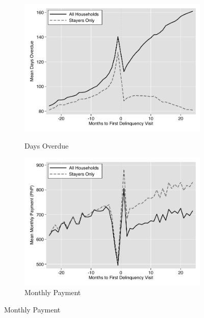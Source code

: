\documentclass[12pt]{article}
\begin{document}
\begin{figure}[t!]
\begin{subfigure}[b]{0.49\textwidth}
        \label{fig:line_bal}
    \end{subfigure}
    \vskip 1mm \vskip 0pt
    \begin{subfigure}[b]{0.49\textwidth}
        \centering
        \caption[]{\small Days Overdue}
        \vspace{-1mm}
        \includegraphics[width=\textwidth,trim={.2cm .2cm .2cm 0cm}, clip=true]{tables/line_ar}
        \label{fig:line_ar}
    \end{subfigure}
    \hfill
    \begin{subfigure}[b]{0.49\textwidth}  
        \centering
        \caption[]{\small Monthly Payment}  
        \vspace{-1mm}
        \includegraphics[width=\textwidth,trim={.2cm .2cm .2cm 0cm}, clip=true]{tables/line_pay}

\end{subfigure}
\end{figure}
\end{document}
